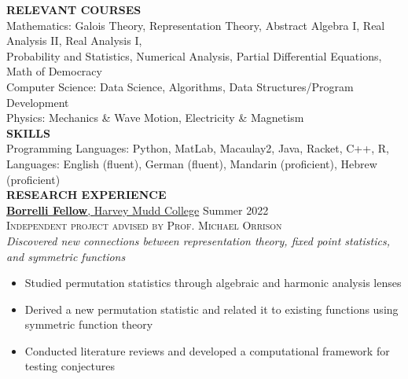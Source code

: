 \documentclass[11pt]{article}
\newcommand{\hdr}[1]{\textcolor{blue(ryb)}{\textbf{#1}}}
\newcommand{\role}[3]{\underline{\textbf{#1}, {#2}} \hfill #3}
\begin{document}
\bigskip
\hdr{RELEVANT COURSES}\\
Mathematics: Galois Theory, Representation Theory, Abstract Algebra I, Real Analysis II, Real Analysis I,\\
\hspace{0.5 cm} Probability and Statistics, Numerical Analysis, Partial Differential Equations, Math of Democracy\\
Computer Science: Data Science, Algorithms, Data Structures/Program Development\\
Physics: Mechanics \& Wave Motion, Electricity \& Magnetism
\bigskip\\
\hdr{SKILLS}\\
Programming Languages: Python, MatLab, Macaulay2, Java, Racket, C++, R,\\
Languages: English (fluent), German (fluent), Mandarin (proficient), Hebrew (proficient)
\bigskip\\
\hdr{RESEARCH EXPERIENCE}\\
\role{Borrelli Fellow}{Harvey Mudd College}{Summer 2022}\\
\textsc{Independent project advised by Prof. Michael Orrison}\\
\textit{Discovered new connections between representation theory, fixed point statistics, and symmetric functions}\\
\begin{itemize}
  \item Studied permutation statistics through algebraic and harmonic analysis lenses
  \item Derived a new permutation statistic and related it to existing functions using symmetric function theory
  \item Conducted literature reviews and developed a computational framework for testing conjectures
\end{itemize}
\end{document}
